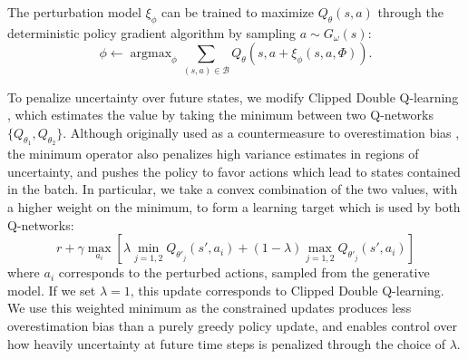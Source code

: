 \documentclass{article}
\newcommand{\y}{\gamma}
\newcommand{\ta}{\theta}
\newcommand{\w}{\omega}
\newcommand{\lb}{\left [}
\newcommand{\rb}{\right ]}
\newcommand{\B}{\mathcal{B}}
\DeclareMathOperator*{\argmax}{argmax}
\begin{document}
The perturbation model $\xi_\phi$ can be trained to maximize $Q_\ta(s,a)$ through the deterministic policy gradient algorithm \citep{DPG} by sampling $a \sim G_\w(s)$: %
\begin{equation}
\phi \leftarrow \argmax_{\phi} \sum_{(s,a) \in \B} Q_\ta(s,a + \xi_{\phi}(s, a, \Phi)). %
\end{equation}


To penalize uncertainty over future states, we modify Clipped Double Q-learning \cite{fujimoto2018addressing}, which estimates the value by taking the minimum between two Q-networks $\{ Q_{\ta_1}, Q_{\ta_2} \}$. Although originally used as a countermeasure to overestimation bias \cite{thrun1993bias, hasselt2010double}, the minimum operator also penalizes high variance estimates in regions of uncertainty, and pushes the policy to favor actions which lead to states contained in the batch. In particular, we take a convex combination of the two values, with a higher weight on the minimum, to form a learning target which is used by both Q-networks:
\vspace{-3mm}
\begin{equation} \label{eqn:soft_min}
r + \y \max_{a_i} \lb \lambda \min_{j=1,2} Q_{\ta'_j}(s',a_i) + (1 - \lambda) \max_{j=1,2} Q_{\ta'_j}(s',a_i) \rb
\end{equation}
where $a_i$ corresponds to the perturbed actions, sampled from the generative model. If we set $\lambda = 1$, this update corresponds to Clipped Double Q-learning. We use this weighted minimum as the constrained updates produces less overestimation bias than a purely greedy policy update, and enables control over how heavily uncertainty at future time steps is penalized through the choice of $\lambda$.  
\end{document}
